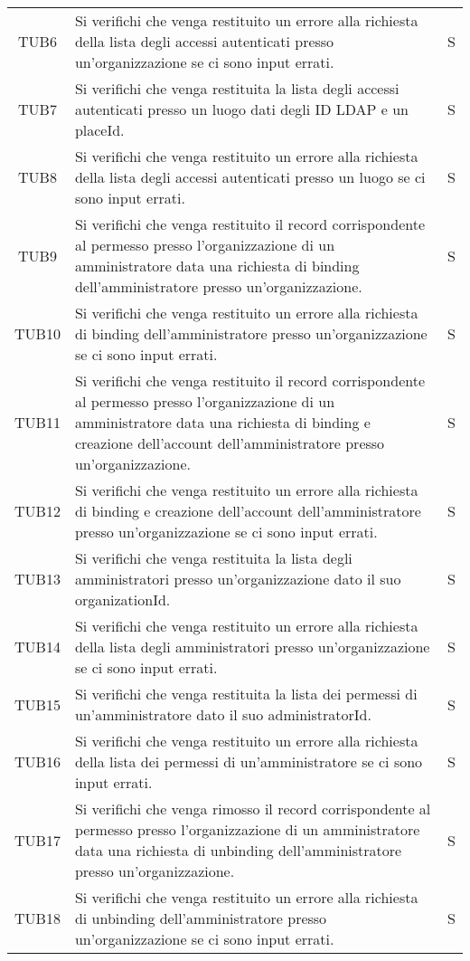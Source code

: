 {\begin{longtable}{ c C{13cm} C{1cm}}
TUB6 & Si verifichi che venga restituito un errore alla richiesta della lista degli accessi autenticati presso un'organizzazione se ci sono input errati. & S \\
TUB7 & Si verifichi che venga restituita la lista degli accessi autenticati presso un luogo dati degli ID LDAP e un placeId. & S \\
TUB8 & Si verifichi che venga restituito un errore alla richiesta della lista degli accessi autenticati presso un luogo se ci sono input errati. & S \\
TUB9 & Si verifichi che venga restituito il record corrispondente al permesso presso l'organizzazione di un amministratore data una richiesta di binding dell'amministratore presso un'organizzazione. & S \\
TUB10 & Si verifichi che venga restituito un errore alla richiesta di binding dell'amministratore presso un'organizzazione se ci sono input errati. & S \\
TUB11 & Si verifichi che venga restituito il record corrispondente al permesso presso l'organizzazione di un amministratore data una richiesta di binding e creazione dell'account dell'amministratore presso un'organizzazione. & S \\
TUB12 & Si verifichi che venga restituito un errore alla richiesta di binding e creazione dell'account dell'amministratore presso un'organizzazione se ci sono input errati. & S \\
TUB13 & Si verifichi che venga restituita la lista degli amministratori presso un'organizzazione dato il suo organizationId. & S \\
TUB14 & Si verifichi che venga restituito un errore alla richiesta della lista degli amministratori presso un'organizzazione se ci sono input errati. & S \\
TUB15 & Si verifichi che venga restituita la lista dei permessi di un'amministratore dato il suo administratorId. & S \\
TUB16 & Si verifichi che venga restituito un errore alla richiesta della lista dei permessi di un'amministratore  se ci sono input errati. & S \\
TUB17 & Si verifichi che venga rimosso il record corrispondente al permesso presso l'organizzazione di un amministratore data una richiesta di unbinding dell'amministratore presso un'organizzazione. & S \\
TUB18 & Si verifichi che venga restituito un errore alla richiesta di unbinding dell'amministratore presso un'organizzazione se ci sono input errati. & S \\

\end{longtable}}
